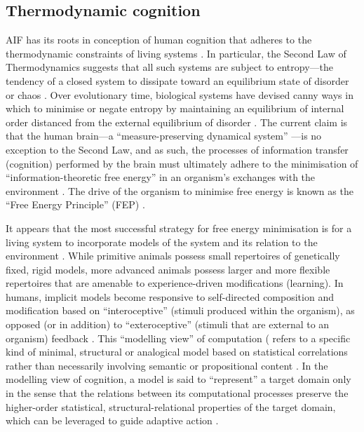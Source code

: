 \begin{CJK}{UTF8}{gbsn}
\subsection{Thermodynamic cognition\label{sect:thermoCog}}
AIF has its roots in conception of human cognition that adheres to the thermodynamic constraints of living systems \citep{Yufik2017}.  In particular, the Second Law of Thermodynamics suggests that all such systems are subject to entropy---the tendency of a closed system to dissipate toward an equilibrium state of disorder or chaos \citep{Wolfram2002}.  Over evolutionary time, biological systems have devised canny ways in which to minimise or negate entropy by maintaining an equilibrium of internal order distanced from the external equilibrium of disorder \citep{Schrodinger1944}.  The current claim is that the human brain---a ``measure-preserving dynamical system'' \citep[c.f.][]{Friston2013}---is no exception to the Second Law, and as such, the processes of information transfer (cognition) performed by the brain must ultimately adhere to the minimisation of ``information-theoretic free energy'' in an organism's exchanges with the environment \citep[entropy can be understood as the average quantity of free energy to which an organism is subject][]{Yufik2002,Yufik2013,Friston2010,Sengupta2013,Sengupta2016,Sengupta2017}. The drive of the organism to minimise free energy is known as the ``Free Energy Principle'' (FEP) \citep[see][]{Friston2010}.

It appears that the most successful strategy for free energy minimisation is for a living system to incorporate models of the system and its relation to the environment \citep{Conant1970}.  While primitive animals possess small repertoires of genetically fixed, rigid models, more advanced animals possess larger and more flexible repertoires that are amenable to experience-driven modifications (learning).  In humans, implicit models become responsive to self-directed composition and modification based on ``interoceptive'' (stimuli produced within the organism), as opposed (or in addition) to ``exteroceptive'' (stimuli that are external to an organism) feedback \citep{Yufik1998,FeldmanBarrett2015}.  This ``modelling view'' of computation (\citep{Grush 2001;Chirimuuta2014} refers to a specific kind of minimal, structural or analogical model based on statistical correlations rather than necessarily involving semantic or propositional content \citep[also known as ``generative models''][]{Friston2001,OBrien2004,Huto2015}.  In the modelling view of cognition, a model is said to ``represent'' a target domain only in the sense that the relations between its computational processes preserve the higher-order statistical, structural-relational properties of the target domain, which can be leveraged to guide adaptive action \citep[see][8]{Ramstead2016}.


\end{CJK}
